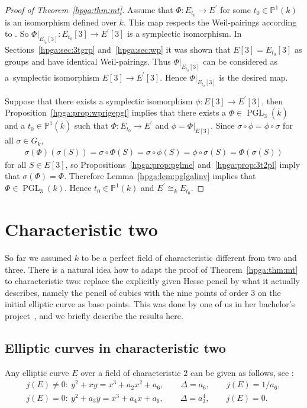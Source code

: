 \documentclass[pdftex]{sigma}
\newcommand{\mpp}{{\mathbb{P}}}
\newcommand{\msetp}[1]{{\left({#1}\right)}}					%
\newcommand{\msets}[1]{{\left[{#1}\right]}}					%
\newcommand{\mac}[1]{{\overline{#1}}}
\newcommand{\mpgl}[2]{{\operatorname{PGL}_{#1}}\msetp{#2}}	%
\newcommand{\mps}[2]{{\mpp^{#1}\msetp{#2}}}						%
\newcommand{\mres}[2]{{\left.{#1}\right|_{#2}}}					%
\numberwithin{equation}{section}
\begin{document}
\begin{proof}[Proof of Theorem~\ref{hpga:thm:mt}] Assume that $\Phi\colon E_{t_0}\rightarrow E^\prime$ for some $t_0\in\mps{1}{k}$ is an isomorphism defined over $k$. This map respects the Weil-pairings according to
\cite[Proposition III.8.2]{silverman1985}. So $\mres{\Phi}{E_{t_0}\msets{3}}\colon E_{t_0}\msets{3}\rightarrow E^\prime\msets{3}$ is a symplectic isomorphism. In Sections~\ref{hpga:sec:3tgrp} and~\ref{hpga:sec:wp} it was shown that $E\msets {3}=E_{t_0}\msets{3}$ as groups and have identical Weil-pairings. Thus $\mres {\Phi}{E_{t_0}\msets{3}}$ can be considered as a~symplectic isomorphism $E\msets {3}\rightarrow E^\prime\msets{3}$. Hence $\mres{\Phi}{E_{t_0}\msets{3}}$ is the desired map.

Suppose that there exists a symplectic isomorphism $\phi\colon E\msets{3}\rightarrow E^\prime\msets{3}$, then Proposition~\ref{hpga:prop:wprigepgl} implies that there exists a $\Phi\in\mpgl{3}{\mac{k}}$ and a $t_0\in\mps{1}{\mac{k}}$ such that $\Phi\colon E_{t_0}\rightarrow E^\prime$ and $\phi=\mres{\Phi}{E\msets{3}}$. Since $\sigma\circ\phi=\phi\circ\sigma$ for all $\sigma\in G_k$,
\begin{gather*}
\sigma\msetp{\Phi}\msetp{\sigma\msetp{S}} =\sigma\circ\Phi\msetp{S} =\sigma\circ\phi\msetp{S} =\phi\circ\sigma\msetp{S} =\Phi\msetp{\sigma\msetp{S}}
\end{gather*}
for all $S\in E\msets{3}$, so Propositions~\ref{hpga:prop:pglme} and~\ref{hpga:prop:3t2pl} imply that $\sigma\msetp{\Phi}=\Phi$. Therefore Lemma~\ref{hpga:lem:pglgalinv} implies that $\Phi\in\mpgl{3}{k}$. Hence $t_0\in\mps{1}{k}$ and $E^\prime\cong_kE_{t_0}$.
\end{proof}

\section{Characteristic two}\label{hpha:sec:char2}

So far we assumed $k$ to be a perfect field of characteristic different from two and three. There is a natural idea how to adapt the proof of Theorem~\ref{hpga:thm:mt} to characteristic two: replace the explicitly given Hesse pencil by what it actually describes, namely the pencil of cubics with the nine points of order $3$ on the initial elliptic curve as base points. This was done by one of us in her bachelor's project~\cite{tuijp2015}, and we briefly describe the results here.
\subsection{Elliptic curves in characteristic two}
Any elliptic curve $E$ over a field of characteristic $2$ can be given as follows, see \cite[p.~409]{silverman1985}:
\begin{gather*}j(E) \neq 0\colon \ y^2 +xy=x^3+a_2x^2+a_6, \qquad \Delta=a_6, \qquad j(E)=1/a_6,\\
j(E) = 0\colon \ y^2 +a_3y=x^3+a_4x+a_6, \qquad \Delta=a_3^4, \qquad j(E)=0.\end{gather*}
\end{document}
